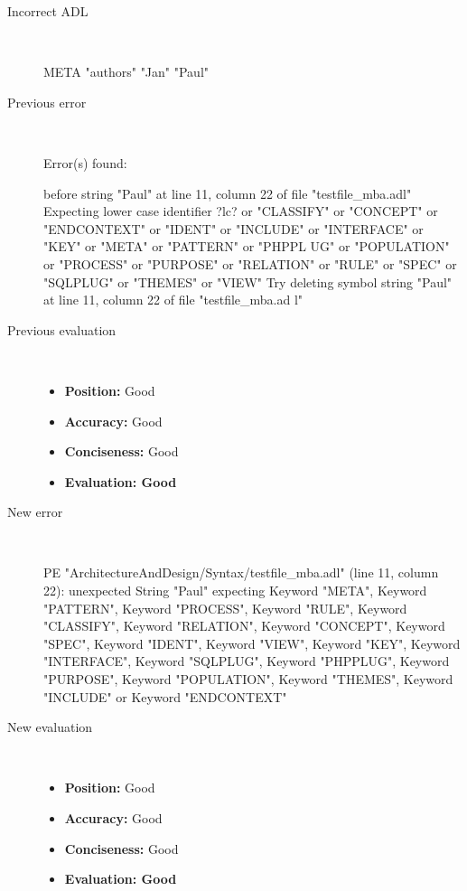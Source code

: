 \hrulefill

\begin{description}
  \item[Incorrect ADL]~\\
\begin{adl}
META "authors" "Jan" "Paul"\end{adl}
  \item[Previous error]~\\
\begin{haskell}
Error(s) found:

before string "Paul" at line 11, column 22 of file "testfile_mba.adl"
Expecting lower case identifier ?lc? or "CLASSIFY" or "CONCEPT" or "ENDCONTEXT"
or "IDENT" or "INCLUDE" or "INTERFACE" or "KEY" or "META" or "PATTERN" or "PHPPL
UG" or "POPULATION" or "PROCESS" or "PURPOSE" or "RELATION" or "RULE" or "SPEC"
or "SQLPLUG" or "THEMES" or "VIEW"
Try deleting symbol string "Paul" at line 11, column 22 of file "testfile_mba.ad
l"

\end{haskell}
  \item[Previous evaluation]~\\
    \begin{itemize}
    \item \textbf{Position:} Good
    \item \textbf{Accuracy:} Good
    \item \textbf{Conciseness:} Good
    \item \textbf{Evaluation: Good}
    \end{itemize}
  \item[New error]~\\
\begin{haskell}
PE "ArchitectureAndDesign/Syntax/testfile_mba.adl" (line 11, column 22):
unexpected String "Paul"
expecting Keyword "META", Keyword "PATTERN", Keyword "PROCESS", Keyword "RULE", Keyword "CLASSIFY", Keyword "RELATION", Keyword "CONCEPT", Keyword "SPEC", Keyword "IDENT", Keyword "VIEW", Keyword "KEY", Keyword "INTERFACE", Keyword "SQLPLUG", Keyword "PHPPLUG", Keyword "PURPOSE", Keyword "POPULATION", Keyword "THEMES", Keyword "INCLUDE" or Keyword "ENDCONTEXT"
\end{haskell}
  \item[New evaluation]~\\
    \begin{itemize}
    \item \textbf{Position:} Good
    \item \textbf{Accuracy:} Good
    \item \textbf{Conciseness:} Good
    \item \textbf{Evaluation: Good}
    \end{itemize}
  \end{description}

